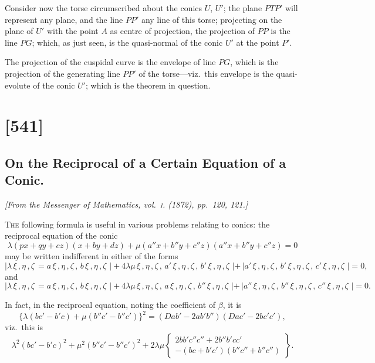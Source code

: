 \documentclass[11pt,a4paper]{article}
\theoremstyle{plain}
\theoremstyle{definition}
\begin{document}
Consider now the torse circumscribed about the conics $U$, $U'$; the plane $PTP'$ will represent any plane, and the line $PP'$ any line of this torse; projecting on the plane of $U'$ with the point $A$ as centre of projection, the projection of $PP$ is the line $PG$; which, as just seen, is the quasi-normal of the conic $U'$ at the point $P'$.

The projection of the cuspidal curve is the envelope of line $PG$, which is the projection of the generating line $PP'$ of the torse---viz.\ this envelope is the quasi-evolute of the conic $U'$; which is the theorem in question.

\clearpage

\section{[541]}
\subsection{On the Reciprocal of a Certain Equation of a Conic.}

\begin{center}
\textit{[From the Messenger of Mathematics, vol.~\textsc{i}. (1872), pp.~120, 121.]}
\end{center}

\textsc{The} following formula is useful in various problems relating to conics: the reciprocal equation of the conic
\[
\lambda (px + qy + cz)(x + by + dz) + \mu (a''x + b''y + c''z)(a''x + b''y + c''z) = 0
\]
may be written indifferent in either of the forms
\[
|\lambda \, \xi\,, \eta\,, \zeta \, = a \, \xi\,, \eta\,, \zeta \, , \, b \, \xi\,, \eta\,, \zeta \, \, |+ 4 \lambda \mu \, \xi\,, \eta\,, \zeta \, , \, a' \, \xi\,, \eta\,, \zeta \, , \, b' \, \xi\,, \eta\,, \zeta \, \, |+ \, |a' \, \xi\,, \eta\,, \zeta \, , \, b' \, \xi\,, \eta\,, \zeta \, , \, c' \, \xi\,, \eta\,, \zeta \, \, | = 0,
\]
and
\[
|\lambda \, \xi\,, \eta\,, \zeta \, = a \, \xi\,, \eta\,, \zeta \, , \, b \, \xi\,, \eta\,, \zeta \, \, |+ 4 \lambda \mu \, \xi\,, \eta\,, \zeta \, , \, a \, \xi\,, \eta\,, \zeta \, , \, b'' \, \xi\,, \eta\,, \zeta \, \, |+ \, |a'' \, \xi\,, \eta\,, \zeta \, , \, b'' \, \xi\,, \eta\,, \zeta \, , \, c'' \, \xi\,, \eta\,, \zeta \, \, | = 0.
\]

In fact, in the reciprocal equation, noting the coefficient of $\beta$, it is
\[
\{\lambda (bc' - b'c) + \mu (b''c' - b''c')\}^2 = (Dab' - 2ab' b'') (Dac' - 2bc'c'),
\]
viz.\ this is
\[
\lambda^2 (bc' - b'c)^2 + \mu^2 (b''c' - b''c')^2 + 2\lambda\mu \left\{ \begin{array}{l} 2bb'c''c'' + 2b''b'cc' \\ -(bc + b'c')(b''c'' + b''c'') \end{array} \right\}.
\]
\end{document}
